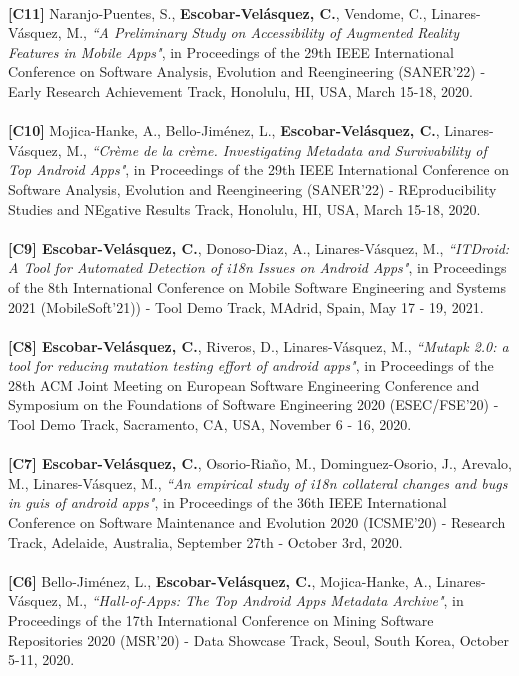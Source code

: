 \documentclass[letterpaper,11pt,oneside]{article}
\begin{document}
\\
\noindent \textbf{[C11]} Naranjo-Puentes, S., \textbf{Escobar-Velásquez, C.}, Vendome, C., Linares-V\'asquez,  M., \textit{``A Preliminary Study on Accessibility of Augmented Reality Features in Mobile Apps"}, in Proceedings of the 29th IEEE International Conference on Software Analysis, Evolution and Reengineering (SANER'22) - Early Research Achievement Track, Honolulu, HI, USA, March 15-18, 2020. \\
\\
\noindent \textbf{[C10]} Mojica-Hanke, A., Bello-Jiménez, L., \textbf{Escobar-Velásquez, C.}, Linares-V\'asquez,  M., \textit{``Cr\`eme de la cr\`eme. Investigating Metadata and Survivability of Top Android Apps"}, in Proceedings of the 29th IEEE International Conference on Software Analysis, Evolution and Reengineering (SANER'22) - REproducibility Studies and NEgative Results Track, Honolulu, HI, USA, March 15-18, 2020. \\
\\
\noindent \textbf{[C9] Escobar-Velásquez, C.}, Donoso-Diaz, A., Linares-V\'asquez,  M., \textit{``ITDroid: A Tool for Automated Detection of i18n Issues on Android Apps"}, in Proceedings of the 8th International Conference on Mobile Software Engineering and Systems 2021 (MobileSoft'21)) - Tool Demo Track, MAdrid, Spain, May 17 - 19, 2021. \\
\\
\noindent \textbf{[C8] Escobar-Velásquez, C.}, Riveros, D., Linares-V\'asquez,  M., \textit{``Mutapk 2.0: a tool for reducing mutation testing effort of android apps"}, in Proceedings of the 28th ACM Joint Meeting on European Software Engineering Conference and Symposium on the Foundations of Software Engineering 2020 (ESEC/FSE’20) - Tool Demo Track, Sacramento, CA, USA, November 6 - 16, 2020. \\
\\
\noindent \textbf{[C7] Escobar-Velásquez, C.}, Osorio-Ria\~no, M., Dominguez-Osorio, J., Arevalo, M., Linares-V\'asquez,  M., \textit{``An empirical study of i18n collateral changes and bugs in guis of android apps"}, in Proceedings of the 36th IEEE International Conference on Software Maintenance and Evolution 2020 (ICSME’20) - Research Track, Adelaide, Australia, September 27th - October 3rd, 2020. \\
\\
\noindent \textbf{[C6]} Bello-Jiménez, L., \textbf{Escobar-Velásquez, C.}, Mojica-Hanke, A., Linares-V\'asquez,  M., \textit{``Hall-of-Apps: The Top Android Apps Metadata Archive"}, in Proceedings of the 17th International Conference on Mining Software Repositories 2020 (MSR’20) - Data Showcase Track, Seoul, South Korea, October 5-11, 2020. \\
\end{document}
